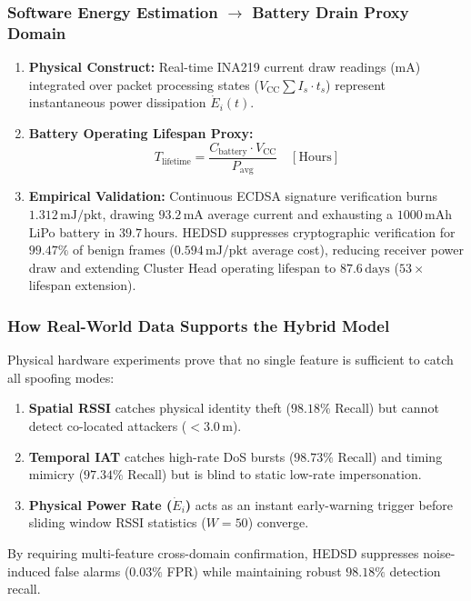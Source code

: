 \subsubsection{Software Energy Estimation $\to$ Battery Drain Proxy Domain}
\begin{enumerate}
    \item \textbf{Physical Construct:} Real-time INA219 current draw readings ($\text{mA}$) integrated over packet processing states ($V_{\text{CC}} \sum I_s \cdot t_s$) represent instantaneous power dissipation $\dot{E}_i(t)$.
    \item \textbf{Battery Operating Lifespan Proxy:}
    \begin{equation}
        T_{\text{lifetime}} = \frac{C_{\text{battery}} \cdot V_{\text{CC}}}{P_{\text{avg}}} \quad [\text{Hours}]
    \end{equation}
    \item \textbf{Empirical Validation:} Continuous ECDSA signature verification burns $1.312\,\text{mJ/pkt}$, drawing $93.2\,\text{mA}$ average current and exhausting a $1000\,\text{mAh}$ LiPo battery in $39.7\,\text{hours}$. HEDSD suppresses cryptographic verification for $99.47\%$ of benign frames ($0.594\,\text{mJ/pkt}$ average cost), reducing receiver power draw and extending Cluster Head operating lifespan to \textbf{$87.6\,\text{days}$} ($53\times$ lifespan extension).
\end{enumerate}

\subsubsection{How Real-World Data Supports the Hybrid Model}
Physical hardware experiments prove that no single feature is sufficient to catch all spoofing modes:
\begin{enumerate}
    \item \textbf{Spatial RSSI} catches physical identity theft ($98.18\%$ Recall) but cannot detect co-located attackers ($<3.0\,\text{m}$).
    \item \textbf{Temporal IAT} catches high-rate DoS bursts ($98.73\%$ Recall) and timing mimicry ($97.34\%$ Recall) but is blind to static low-rate impersonation.
    \item \textbf{Physical Power Rate ($\dot{E}_i$)} acts as an instant early-warning trigger before sliding window RSSI statistics ($W=50$) converge.
\end{enumerate}

By requiring multi-feature cross-domain confirmation, HEDSD suppresses noise-induced false alarms ($0.03\%$ FPR) while maintaining robust $98.18\%$ detection recall.
